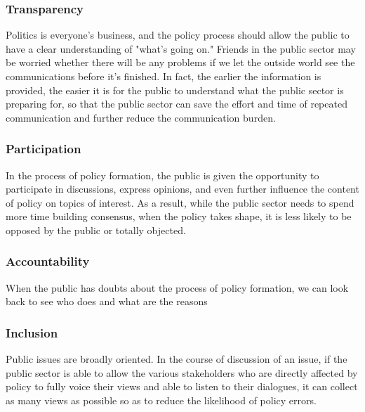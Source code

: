 \documentclass{IEEEtran}
\begin{document}
\subsubsection{Transparency}
Politics is everyone's business, and the policy process should allow the public to have a clear understanding of "what's going on." Friends in the public sector may be worried whether there will be any problems if we let the outside world see the communications before it's finished. In fact, the earlier the information is provided, the easier it is for the public to understand what the public sector is preparing for, so that the public sector can save the effort and time of repeated communication and further reduce the communication burden. 
\subsubsection{Participation}
In the process of policy formation, the public is given the opportunity to participate in discussions, express opinions, and even further influence the content of policy on topics of interest. As a result, while the public sector needs to spend more time building consensus, when the policy takes shape, it is less likely to be opposed by the public or totally objected.  
\subsubsection{Accountability}
When the public has doubts about the process of policy formation, we can look back to see who does and what are the reasons   
\subsubsection{Inclusion}
Public issues are broadly oriented. In the course of discussion of an issue, if the public sector is able to allow the various stakeholders who are directly affected by policy to fully voice their views and able to listen to their dialogues, it can collect as many views as possible so as to reduce the likelihood of policy errors. 


\end{document}
